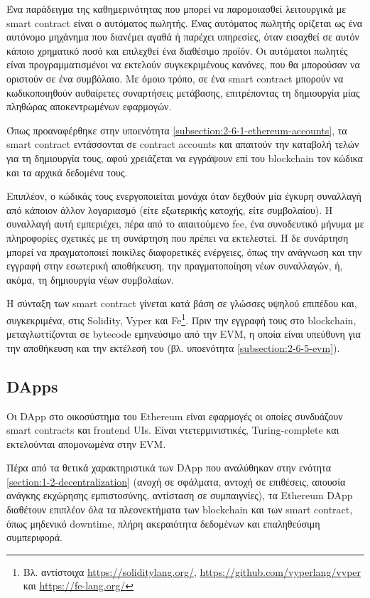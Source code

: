 Ένα παράδειγμα της καθημερινότητας που μπορεί να παρομοιασθεί λειτουργικά με smart contract είναι ο αυτόματος πωλητής\cite{2.6-ethereum-smart-contracts}. Ένας αυτόματος πωλητής ορίζεται ως ένα αυτόνομο μηχάνημα που διανέμει αγαθά ή παρέχει υπηρεσίες, όταν εισαχθεί σε αυτόν κάποιο χρηματικό ποσό και επιλεχθεί ένα διαθέσιμο προϊόν. Οι αυτόματοι πωλητές είναι προγραμματισμένοι να εκτελούν συγκεκριμένους κανόνες, που θα μπορούσαν να οριστούν σε ένα συμβόλαιο. Με όμοιο τρόπο, σε ένα smart contract μπορούν να κωδικοποιηθούν αυθαίρετες συναρτήσεις μετάβασης, επιτρέποντας τη δημιουργία μίας πληθώρας αποκεντρωμένων εφαρμογών.

Όπως προαναφέρθηκε στην υποενότητα \ref{subsection:2-6-1-ethereum-accounts}, τα smart contract εντάσσονται σε contract accounts και απαιτούν την καταβολή τελών για τη δημιουργία τους, αφού χρειάζεται να εγγράψουν επί του blockchain τον κώδικα και τα αρχικά δεδομένα τους.

Επιπλέον, ο κώδικάς τους ενεργοποιείται μονάχα όταν δεχθούν μία έγκυρη συναλλαγή από κάποιον άλλον λογαριασμό (είτε εξωτερικής κατοχής, είτε συμβολαίου). Η συναλλαγή αυτή εμπεριέχει, πέρα από το απαιτούμενο fee, ένα συνοδευτικό μήνυμα με πληροφορίες σχετικές με τη συνάρτηση που πρέπει να εκτελεστεί. Η δε συνάρτηση μπορεί να πραγματοποιεί ποικίλες διαφορετικές ενέργειες, όπως την ανάγνωση και την εγγραφή στην εσωτερική αποθήκευση, την πραγματοποίηση νέων συναλλαγών, ή, ακόμα, τη δημιουργία νέων συμβολαίων.

Η σύνταξη των smart contract γίνεται κατά βάση σε γλώσσες υψηλού επιπέδου και, συγκεκριμένα, στις Solidity, Vyper και Fe\footnote{Βλ. αντίστοιχα \url{https://soliditylang.org/}, \url{https://github.com/vyperlang/vyper} και \url{https://fe-lang.org/}}. Πριν την εγγραφή τους στο blockchain, μεταγλωττίζονται σε bytecode εμηνεύσιμο από την EVM, η οποία είναι υπεύθυνη για την αποθήκευση και την εκτέλεσή του (βλ. υποενότητα \ref{subsection:2-6-5-evm}).

\subsection{DApps}
Οι DApp στο οικοσύστημα του Ethereum είναι εφαρμογές οι οποίες συνδυάζουν \textenglish{smart contracts} και  \textenglish{frontend UIs}. Είναι ντετερμινιστικές, Turing-complete και εκτελούνται απομονωμένα στην EVM.\cite{2.6-ethereum-documentation}

Πέρα από τα θετικά χαρακτηριστικά των DApp που αναλύθηκαν στην ενότητα \ref{section:1-2-decentralization} (ανοχή σε σφάλματα, αντοχή σε επιθέσεις, απουσία ανάγκης εκχώρησης εμπιστοσύνης, αντίσταση σε συμπαιγνίες), τα Ethereum DApp διαθέτουν επιπλέον όλα τα πλεονεκτήματα των blockchain και των smart contract, όπως μηδενικό downtime, πλήρη ακεραιότητα δεδομένων και επαληθεύσιμη συμπεριφορά.

